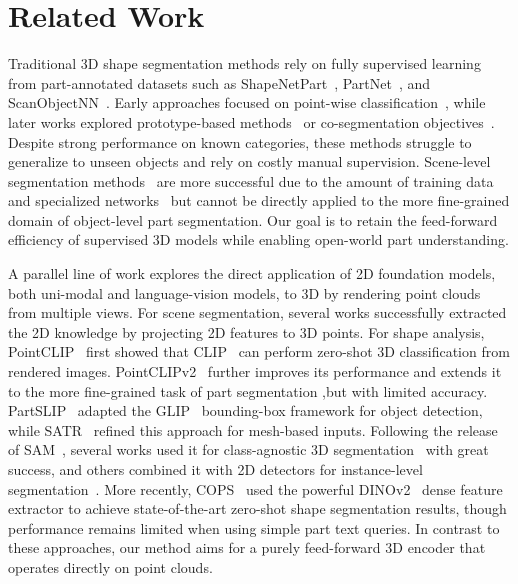\section{Related Work}
\label{sec:related}


Traditional 3D shape segmentation methods rely on fully supervised learning from part-annotated datasets such as ShapeNetPart~\cite{yi2016scalable}, PartNet~\cite{mo2019partnet}, and ScanObjectNN~\cite{uy2019revisiting}.
Early approaches focused on point-wise classification~\cite{Qi2016PointNetDL, Qi2017PointNetDH}, while later works explored prototype-based methods~\cite{He2020LearningAM, Yi2018GSPNGS} or co-segmentation objectives~\cite{Chen2019BAENETBA, Zhu2019AdaCoSegAS}.
Despite strong performance on known categories, these methods struggle to generalize to unseen objects and rely on costly manual supervision.
Scene-level segmentation methods~\cite{wu2024point} are more successful due to the amount of training data~\cite{Dai2017ScanNetR3, Yeshwanth2023ScanNetAH} and specialized networks~\cite{wu2024point} but cannot be directly applied to the more fine-grained domain of object-level part segmentation.
Our goal is to retain the feed-forward efficiency of supervised 3D models while enabling open-world part understanding.

A parallel line of work explores the direct application of 2D foundation models, both uni-modal and language-vision models, to 3D by rendering point clouds from multiple views.
For scene segmentation, several works \cite{Nguyen2023Open3DISO3, 10655587, Peng2022OpenScene3S, Takmaz2023OpenMask3DO3} successfully extracted the 2D knowledge by projecting 2D features to 3D points. 
For shape analysis, PointCLIP~\cite{zhu2022pointclip} first showed that CLIP~\cite{radford2021learning} can perform zero-shot 3D classification from rendered images.
PointCLIPv2~\cite{zhu2022pointclip} further improves its performance and extends it to the more fine-grained task of part segmentation ,but with limited accuracy.
PartSLIP~\cite{liu2023partslip} adapted the GLIP~\cite{Li2021GroundedLP} bounding-box framework for object detection, while SATR~\cite{abdelreheem2023satr} refined this approach for mesh-based inputs.
Following the release of SAM~\cite{kirillov2023segment, ravi2024sam}, several works used it for class-agnostic 3D segmentation~\cite{Yang2024SAMPart3DSA, Liu2025PARTFIELDL3} with great success, and others combined it with 2D detectors for instance-level segmentation~\cite{Zhou2023PartSLIPEL, Xue2023ZeroPSHC}.
More recently, COPS~\cite{garosi20253d} used the powerful DINOv2~\cite{oquab2023dinov2} dense feature extractor to achieve state-of-the-art zero-shot shape segmentation results, though performance remains limited when using simple part text queries.
In contrast to these approaches, our method aims for a purely feed-forward 3D encoder that operates directly on point clouds.

